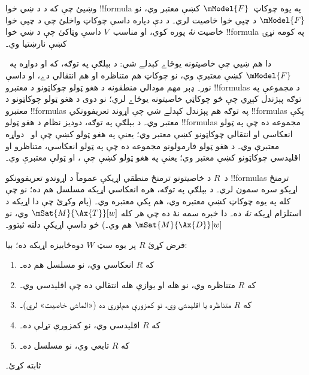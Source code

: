 \documentclass[../../../include/open-logic-section]{subfiles}
\begin{document}
\begin{prob}
وښيئ چې که د  د ښي خوا
!!{formula} په يوه چوکاټ~$\mModel{F}$ کښې معتبر وي، نو
$\mModel{F}$ د چپې خوا خاصيت لري۔ د دې دپاره داسې چوکاټ واخلئ
چې د چپې خوا خاصيت \emph{نۀ} پوره کوي، او مناسب~$V$ داسې
وټاکئ چې د ښي خوا !!{formula} په کومه نړۍ کښې نارښتيا وي۔
\end{prob}

 دا هم ښيي چې خاصيتونه يوځاے کېدلے
شي: د بېلګې په توګه، که  او  دواړه په~$\mModel{F}$
کښې معتبرې وي، نو چوکاټ هم متناظره او هم انتقالي دے، او داسې نور۔
ډېر مهم مودالي منطقونه د هغو ټولو چوکاټونو د معتبرو !!{formula}s د
مجموعې په توګه پېژندل کېږي چې څو چوکاټي خاصيتونه يوځاے لري؛ نو دوى
د هغو ټولو چوکاټونو د معتبرو !!{formula}s په توګه هم پېژندل کېدلے
شي چې اړوند تعريفوونکي !!{formula}s پکې معتبر وي۔ د بېلګې په توګه،
دوديز نظام  د هغو ټولو !!{formula}s مجموعه ده چې په ټولو
انعکاسي او انتقالي چوکاټونو کښې معتبر وي؛ يعنې په هغو ټولو کښې چې
 او~ دواړه معتبرې وي۔  د هغو ټولو فارمولونو
مجموعه ده چې په ټولو انعکاسي، متناظرو او اقليدسي چوکاټونو کښې معتبر
وي؛ يعنې په هغو ټولو کښې چې ،  او  ټولې
معتبرې وي۔

د~$R$ د خاصيتونو ترمنځ منطقي اړيکې عموماً د اړوندو تعريفوونکو
!!{formula}s ترمنځ اړيکو سره سمون لري۔ د بېلګې په توګه، هره انعکاسي
اړيکه مسلسل هم ده؛ نو چې کله  په يوه چوکاټ کښې معتبره وي،
 هم پکې معتبره وي۔ (پام وکړئ چې دا اړيکه د استلزام اړيکه
\emph{نۀ} ده۔ دا خبره سمه نۀ ده چې هر کله
$\mSat{M}{\Ax{T}}[w]$ وي، نو $\mSat{M}{\Ax{D}}[w]$ هم وي۔)
څو داسې اړيکې دلته ثبتوو۔

\begin{prop}
  فرض کړئ $R$ پر يوه سټ $W$ دوه‌ځاييزه اړيکه ده؛ بيا:
  \begin{enumerate}
  \item که $R$ انعکاسي وي، نو مسلسل هم ده۔
  \item که $R$ متناظره وي، نو هله او يوازې هله انتقالي ده چې
    اقليدسي وي۔
  \item که $R$ متناظره يا اقليدسي وي، نو کمزورې هم‌لوري ده
    («الماسي خاصيت» لري)۔
  \item که $R$ اقليدسي وي، نو کمزورې تړلې ده۔
  \item که $R$ تابعي وي، نو مسلسل ده۔  
  \end{enumerate}
\end{prop}

\begin{prob}
   ثابته کړئ۔
\end{prob}
\end{document}
